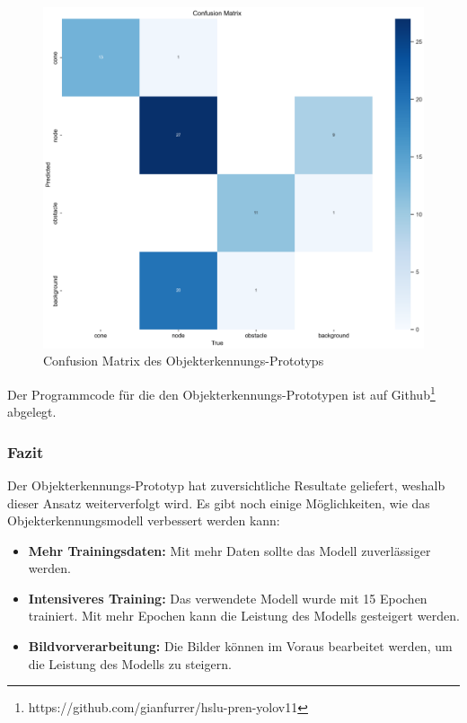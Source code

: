 \documentclass[../main.tex]{subfiles}
\begin{document}
\begin{figure}[H]
\includegraphics[width=\textwidth]{img/prototyping/objekterkennung/ConfusionMatrix.png}
\caption{Confusion Matrix des Objekterkennungs-Prototyps}
\label{img:objectdetection_prototype_confusion_matrix}
\end{figure}

Der Programmcode für die den Objekterkennungs-Prototypen ist auf Github\footnote{https://github.com/gianfurrer/hslu-pren-yolov11} abgelegt.

\subsubsection{Fazit}

Der Objekterkennungs-Prototyp hat zuversichtliche Resultate geliefert, weshalb dieser Ansatz weiterverfolgt wird. Es gibt noch einige Möglichkeiten, wie das Objekterkennungsmodell verbessert werden kann:
\begin{itemize}
    \item \textbf{Mehr Trainingsdaten:} Mit mehr Daten sollte das Modell zuverlässiger werden.
    \item \textbf{Intensiveres Training:} Das verwendete Modell wurde mit 15 Epochen trainiert. Mit mehr Epochen kann die Leistung des Modells gesteigert werden.
    \item \textbf{Bildvorverarbeitung:} Die Bilder können im Voraus bearbeitet werden, um die Leistung des Modells zu steigern.
\end{itemize}
\end{document}
